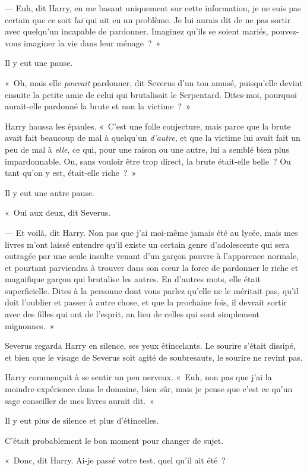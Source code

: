 --- Euh, dit Harry, en me basant uniquement sur cette information, je ne suis pas certain que ce soit \emph{lui} qui ait eu un problème. Je lui aurais dit de ne pas sortir avec quelqu'un incapable de pardonner. Imaginez qu'ils se soient mariés, pouvez-vous imaginer la vie dans leur ménage~?~»

Il y eut une pause.

«~Oh, mais elle \emph{pouvait} pardonner, dit Severus d'un ton amusé, puisqu'elle devint ensuite la petite amie de celui qui brutalisait le Serpentard. Dites-moi, pourquoi aurait-elle pardonné la brute et non la victime~?~»

Harry haussa les épaules. «~C'est une folle conjecture, mais parce que la brute avait fait beaucoup de mal à quelqu'un \emph{d'autre}, et que la victime lui avait fait un peu de mal à \emph{elle}, ce qui, pour une raison ou une autre, lui a semblé bien plus impardonnable. Ou, sans vouloir être trop direct, la brute était-elle belle~? Ou tant qu'on y est, était-elle riche~?~»

Il y eut une autre pause.

«~Oui aux deux, dit Severus.

--- Et voilà, dit Harry. Non pas que j'ai moi-même jamais été au lycée, mais mes livres m'ont laissé entendre qu'il existe un certain genre d'adolescente qui sera outragée par une seule insulte venant d'un garçon pauvre à l'apparence normale, et pourtant parviendra à trouver dans son cœur la force de pardonner le riche et magnifique garçon qui brutalise les autres. En d'autres mots, elle était superficielle. Dites à la personne dont vous parlez qu'elle ne le méritait pas, qu'il doit l'oublier et passer à autre chose, et que la prochaine fois, il devrait sortir avec des filles qui ont de l'esprit, au lieu de celles qui sont simplement mignonnes.~»

Severus regarda Harry en silence, ses yeux étincelants. Le sourire s'était dissipé, et bien que le visage de Severus soit agité de soubresauts, le sourire ne revint pas.

Harry commençait à se sentir un peu nerveux. «~Euh, non pas que j'ai la moindre expérience dans le domaine, bien sûr, mais je pense que c'est ce qu'un sage conseiller de mes livres aurait dit.~»

Il y eut plus de silence et plus d'étincelles.

C'était probablement le bon moment pour changer de sujet.

«~Donc, dit Harry. Ai-je passé votre test, quel qu'il ait été~?

